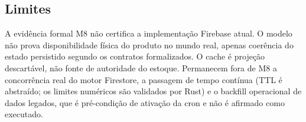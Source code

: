 \begingroup\small\raggedright


\par\endgroup

\subsection*{Limites}
A evidência formal M8 não certifica a implementação Firebase atual. O modelo não
prova disponibilidade física do produto no mundo real, apenas coerência do
estado persistido segundo os contratos formalizados. O cache é projeção
descartável, não fonte de autoridade do estoque. Permanecem fora de M8 a
concorrência real do motor Firestore, a passagem de tempo contínua (TTL é
abstraído; os limites numéricos são validados por Rust) e o backfill
operacional de dados legados, que é pré-condição de ativação da cron e não é
afirmado como executado.
